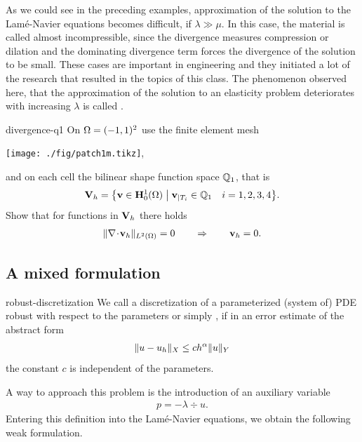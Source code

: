 \begin{intro}
  As we could see in the preceding examples, approximation
  of the solution to the Lamé-Navier equations becomes difficult, if
  $\lambda \gg \mu$. In this case, the material is called almost
  incompressible, since the divergence measures compression or
  dilation and the dominating divergence term forces the divergence of
  the solution to be small. These cases are important in engineering
  and they initiated a lot of the research that resulted in the topics
  of this class. The phenomenon observed here, that the approximation
  of the solution to an elasticity problem deteriorates with
  increasing $\lambda$ is called .
\end{intro}

\begin{Problem}{divergence-q1}
  On $\Omega = (-1,1)^2$ use the finite element mesh
  \begin{center}
  \texttt{[image: ./fig/patch1m.tikz]}, 
  \end{center}
  and on each cell the bilinear shape function space $\mathbb Q_1$, that is
  \begin{gather}
    \mathbf V_h = \bigl\{ \mathbf v\in \mathbf H^1_0(\Omega) \;\big|\;
    \mathbf v_{|T_i} \in \mathbb Q_1\quad i=1,2,3,4\bigr\}.
  \end{gather}
  Show that for functions in $\mathbf V_h$ there holds
  \begin{gather}
    \lVert\nabla\!\cdot\! \mathbf v_h\rVert_{L^2(\Omega)} = 0
    \qquad\Rightarrow\qquad
    \mathbf v_h = 0.
  \end{gather}
\end{Problem}

\subsection{A mixed formulation}

\begin{Definition}{robust-discretization}
  We call a discretization of a parameterized (system of) PDE robust
  with respect to the parameters or simply , if in an
  error estimate of the abstract form
  \begin{gather}
    \lVert u-u_h\rVert_X \le c h^\alpha \lVert u\rVert_Y
  \end{gather}
  the constant $c$ is independent of the parameters.
\end{Definition}

A way to approach this problem is the introduction of an auxiliary variable
\begin{gather}
  p = -\lambda \div u.
\end{gather}
Entering this definition into the Lamé-Navier equations, we obtain
the following weak formulation.

